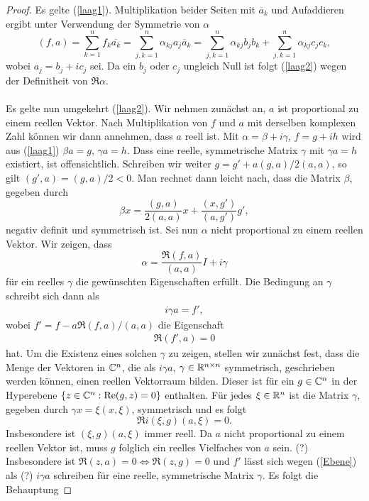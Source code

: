 \begin{proof}
Es gelte (\ref{laag1}). Multiplikation beider Seiten mit $\overline a_k$ und Aufaddieren ergibt unter Verwendung der Symmetrie von $\alpha$
\[
(f,a) = \sum_{k=1}^{n}f_k \overline{a_k} = \sum_{j,k=1}^{n} \alpha_{kj} a_j \overline a_k
=  \sum_{j,k=1}^{n} \alpha_{kj} b_j b_k +  \sum_{j,k=1}^{n} \alpha_{kj} c_j c_k,
\]
wobei $a_j = b_j + ic_j$ sei. Da ein $b_j$ oder $c_j$ ungleich Null ist folgt (\ref{laag2}) wegen der Definitheit von $\Re \alpha$.\\ \\
Es gelte nun umgekehrt (\ref{laag2}). Wir nehmen zunächst an, $a$ ist proportional zu einem reellen Vektor. Nach Multiplikation von $f$ und $a$ mit derselben komplexen Zahl können wir dann annehmen, dass $a$ reell ist. Mit $\alpha = \beta + i \gamma$, $f= g+ih$ wird aus (\ref{laag1}) $\beta a = g$, $\gamma a = h$. Dass eine reelle, symmetrische Matrix $\gamma$ mit $\gamma a = h$ existiert, ist offensichtlich. Schreiben wir weiter $g = g' + a (g,a)/2(a,a)$, so gilt $(g',a) = (g,a)/2 < 0$. Man rechnet dann leicht nach, dass die Matrix $\beta$, gegeben durch
\[
\beta x = \dfrac{(g,a)}{2(a,a)} x + \dfrac{(x,g')}{(a,g')} g',
\]
negativ definit und symmetrisch ist. Sei nun $\alpha$ nicht proportional zu einem reellen Vektor. Wir zeigen, dass 
\[
\alpha = \dfrac{\Re (f,a)}{(a,a)} I + i \gamma
\]
für ein reelles $\gamma$ die gewünschten Eigenschaften erfüllt. Die Bedingung an $\gamma$ schreibt sich dann als
\begin{align}
	i \gamma a = f',
\end{align}
wobei $f' = f - a \Re (f,a)/(a,a)$ die Eigenschaft
\begin{align}
	\label{Ebene}
\Re (f',a) = 0
\end{align}
hat. Um die Existenz eines solchen $\gamma$ zu zeigen, stellen wir zunächst fest, dass die Menge der Vektoren in $\mathbb C^n$, die als $i \gamma a$, $\gamma \in \mathbb R^{n \times n}$ symmetrisch, geschrieben werden können, einen reellen Vektorraum bilden. Dieser ist für ein $g \in \mathbb C^n$ in der Hyperebene $\{ z \in \mathbb C^n : \operatorname{Re} (g,z) = 0 \}$ enthalten. Für jedes $\xi \in \mathbb R^n$ ist die Matrix $\gamma$, gegeben durch $\gamma x = \xi (x,\xi)$, symmetrisch und es folgt
\[
\Re i(\xi,g)(a,\xi) = 0.
\]
Insbesondere ist $(\xi,g)(a,\xi)$ immer reell. Da $a$ nicht proportional zu einem reellen Vektor ist, muss $g$ folglich ein reelles Vielfaches von $a$ sein. (?) Insbesondere ist $\Re(z,a) = 0 \Leftrightarrow \Re(z,g) = 0$ und $f'$ lässt sich wegen (\ref{Ebene}) als (?) $i \gamma a$ schreiben für eine reelle, symmetrische Matrix $\gamma$.  Es folgt die Behauptung
\end{proof}

